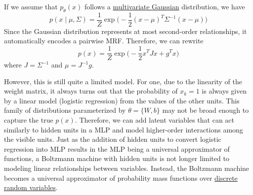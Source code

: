 \documentclass{article}
\begin{document}
  \begin{example}
    \label{ex:gaussian-markov-random-fields}
 
    If we assume that $p_{\theta} (x)$ follows a \hyperref[prob-def:multivariate-gaussian]{multivariate Gaussian} distribution, we have 
    \begin{equation}
      p(x \mid \mu, \Sigma) = \frac{1}{Z} \exp \bigg( -\frac{1}{2} (x - \mu)^T \Sigma^{-1} (x - \mu) \bigg)
    \end{equation}
    Since the Gaussian distribution represents at most second-order relationships, it automatically encodes a pairwise MRF. Therefore, we can rewrite 
    \begin{equation}
      p(x) = \frac{1}{Z} \exp \bigg( -\frac{1}{2} x^T Jx + g^T x \bigg)
    \end{equation}
    where $J = \Sigma^{-1}$ and $\mu = J^{-1} g$. 
  \end{example}

  However, this is still quite a limited model. For one, due to the linearity of the weight matrix, it always turns out that the probability of $x_k = 1$ is always given by a linear model (logistic regression) from the values of the other units. This family of distributions parameterized by $\theta = \{W, b\}$ may not be broad enough to capture the true $p(x)$. Therefore, we can add latent variables that can act similarly to hidden units in a MLP and model higher-order interactions among the visible units. Just as the addition of hidden units to convert logistic regression into MLP results in the MLP being a universal approximator of functions, a Boltzmann machine with hidden units is not longer limited to modeling linear relationships between variables. Instead, the Boltzmann machine becomes a universal approximator of probability mass functions over \hyperref[prob-def:discrete-random-variable]{discrete random variables}. 
\end{document}
